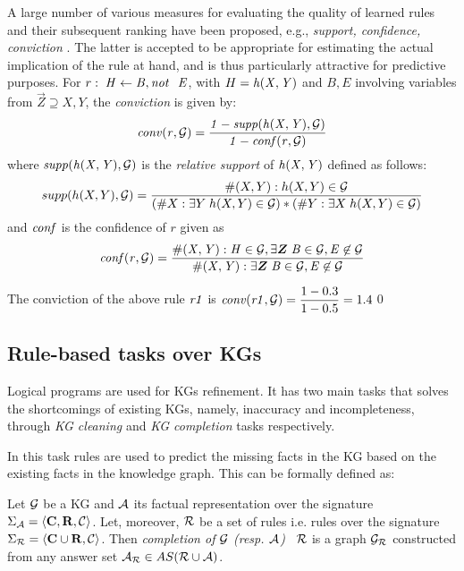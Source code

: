 A large number of various measures for evaluating the quality of learned rules and their subsequent ranking have been proposed, e.g., \emph{support, confidence, conviction} \cite{convict}. The latter is accepted to be appropriate for estimating the actual implication of the rule at hand, and is thus particularly attractive for predictive purposes. For $r:\;\mathit{H\leftarrow B, \mathit{not}~ \ E}$, with $H=\mathit{h(X,Y)}$ and $B,E$ involving variables from $\vec{Z}\supseteq X,Y$, the \emph{conviction} is given by:
\vspace{-.26cm}
\begin{equation}
\mathit{conv(r, \mathcal{G})= \dfrac{1 - supp(h(X,Y), \mathcal{G})}{1 - conf(r, \mathcal{G})}}
\end{equation}
where $\mathit{supp(h(X,Y),\mathcal{G})}$ is the \textit{relative support} of $\mathit{h(X,Y)}$ defined as follows:
\vspace{-.28cm}
\begin{equation}
supp(h(X,Y),\mathcal{G})=\dfrac{\#(X,Y):h(X,Y)\in \mathcal{G}}{(\#X:\exists Y\;h(X,Y)\in \mathcal{G})*(\#Y:\exists X\;h(X,Y)\in \mathcal{G})}
\end{equation}
and $\mathit{conf}$ is the confidence of $r$ given as
\begin{equation}
\mi{conf(r,\cG)=\dfrac{\#(X,Y): H \in \cG, \exists \vec{Z}\;B\in \cG,E \not \in \cG}{\#(X,Y):\exists \vec{Z}\; B\in \cG, E \not \in \cG}}
\end{equation}
\vspace{-.3cm}
\begin{example}
The conviction of the above rule $\mathit{r1}$ is $\mathit{conv(r1,\mathcal{G})}=\dfrac{1-0.3}{1-0.5}=1.4$\qed
\end{example}


\subsection{Rule-based tasks over KGs} Logical programs are used for KGs refinement. It has two main tasks that solves the shortcomings of existing KGs, namely, inaccuracy and incompleteness, through \textit{KG cleaning} and \textit{KG completion} tasks respectively.


 In this task rules are used to predict the missing facts in the KG based on the existing facts in the knowledge graph. This can be formally defined as:

\begin{definition}\label{def:graphcompl}
Let $\mathcal{G}$ be a KG and $\mathcal{A}$ its factual representation over the signature $\Sigma_{\mathcal{A}}=\langle\mathbf{C},\mathbf{R},\mathcal{C}\rangle$. Let, moreover, $\mathcal{R}$ be a set of rules %
 i.e. rules over the signature $\Sigma_{\mathcal{R}}=\langle\mathbf{C}\cup \mathbf{R},\mathcal{C}\rangle$. %
Then \emph{completion of $\mathcal{G}$ (resp. $\mathcal{A}$) \wrt\ $\mathcal{R}$} is a graph $\mathcal{G}_{\mathcal{R}}$ constructed from any answer set $\mathcal{A}_{\mathcal{R}}\in AS(\mathcal{R} \cup \mathcal{A})$. 
\end{definition}

